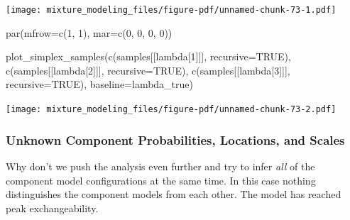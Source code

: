 \documentclass[
  letterpaper,
  DIV=11,
  numbers=noendperiod]{scrartcl}
\newenvironment{Shaded}{\begin{snugshade}}{\end{snugshade}}
\newcommand{\AttributeTok}[1]{\textcolor[rgb]{0.40,0.45,0.13}{#1}}
\newcommand{\ConstantTok}[1]{\textcolor[rgb]{0.56,0.35,0.01}{#1}}
\newcommand{\DecValTok}[1]{\textcolor[rgb]{0.68,0.00,0.00}{#1}}
\newcommand{\FunctionTok}[1]{\textcolor[rgb]{0.28,0.35,0.67}{#1}}
\newcommand{\NormalTok}[1]{\textcolor[rgb]{0.00,0.23,0.31}{#1}}
\newcommand{\StringTok}[1]{\textcolor[rgb]{0.13,0.47,0.30}{#1}}
\begin{document}
\texttt{[image: mixture\_modeling\_files/figure-pdf/unnamed-chunk-73-1.pdf]}

\begin{Shaded}
\begin{Highlighting}[]
\FunctionTok{par}\NormalTok{(}\AttributeTok{mfrow=}\FunctionTok{c}\NormalTok{(}\DecValTok{1}\NormalTok{, }\DecValTok{1}\NormalTok{), }\AttributeTok{mar=}\FunctionTok{c}\NormalTok{(}\DecValTok{0}\NormalTok{, }\DecValTok{0}\NormalTok{, }\DecValTok{0}\NormalTok{, }\DecValTok{0}\NormalTok{))}

\FunctionTok{plot\_simplex\_samples}\NormalTok{(}\FunctionTok{c}\NormalTok{(samples[[}\StringTok{\textquotesingle{}lambda[1]\textquotesingle{}}\NormalTok{]], }\AttributeTok{recursive=}\ConstantTok{TRUE}\NormalTok{),}
                     \FunctionTok{c}\NormalTok{(samples[[}\StringTok{\textquotesingle{}lambda[2]\textquotesingle{}}\NormalTok{]], }\AttributeTok{recursive=}\ConstantTok{TRUE}\NormalTok{),}
                     \FunctionTok{c}\NormalTok{(samples[[}\StringTok{\textquotesingle{}lambda[3]\textquotesingle{}}\NormalTok{]], }\AttributeTok{recursive=}\ConstantTok{TRUE}\NormalTok{),}
                     \AttributeTok{baseline=}\NormalTok{lambda\_true)}
\end{Highlighting}
\end{Shaded}

\texttt{[image: mixture\_modeling\_files/figure-pdf/unnamed-chunk-73-2.pdf]}

\subsubsection{Unknown Component Probabilities, Locations, and
Scales}\label{unknown-component-probabilities-locations-and-scales}

Why don't we push the analysis even further and try to infer \emph{all}
of the component model configurations at the same time. In this case
nothing distinguishes the component models from each other. The model
has reached peak exchangeability.
\end{document}
